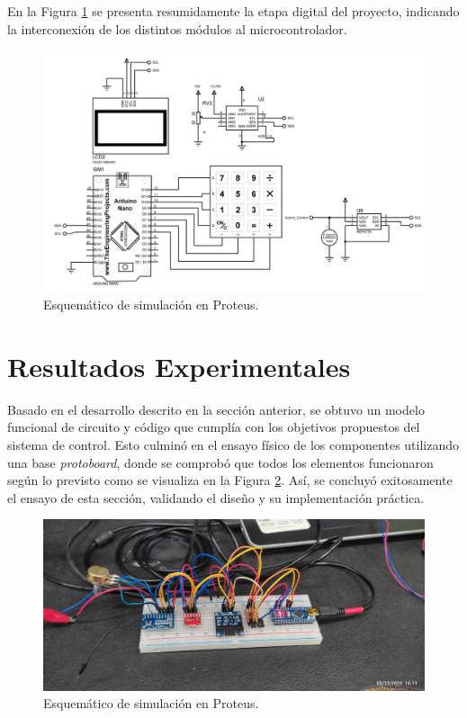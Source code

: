 En la Figura \ref{F:esquematico_proteus} se presenta resumidamente la etapa digital del proyecto, indicando la interconexión de los distintos módulos al microcontrolador.
\begin{figure}[H]
    \centering
    \includegraphics[scale=0.4]{./imagenes/proteus_esquema2.jpg}
    \caption{Esquemático de simulación en Proteus.}
    \label{F:esquematico_proteus}
\end{figure}

\section{Resultados Experimentales}
Basado en el desarrollo descrito en la sección anterior, se obtuvo un modelo funcional de circuito y código que cumplía con los objetivos propuestos del sistema de control. Esto culminó en el ensayo físico de los componentes utilizando una base \textit{protoboard}, donde se comprobó que todos los elementos funcionaron según lo previsto como se visualiza en la Figura \ref{F:ensayo_digital}. Así, se concluyó exitosamente el ensayo de esta sección, validando el diseño y su implementación práctica.
\begin{figure}[H]
    \centering
    \includegraphics[scale=0.08]{./imagenes/ensayo_digital.jpg}
    \caption{Esquemático de simulación en Proteus.}
    \label{F:ensayo_digital}
\end{figure}